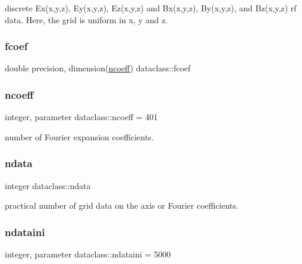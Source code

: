 discrete Ex(x,y,z), Ey(x,y,z), Ez(x,y,z) and Bx(x,y,z), By(x,y,z), and Bz(x,y,z) rf data. Here, the grid is uniform in x, y and z. 

\mbox{\label{namespacedataclass_ac8605e11e3fc14fbebbc843cc36c2836}} 
\subsubsection{\texorpdfstring{fcoef}{fcoef}}
{\footnotesize\ttfamily double precision, dimension(\mbox{\hyperlink{namespacedataclass_aea44837b0eb59e9b5a864f3a59c7facc}{ncoeff}}) dataclass\+::fcoef}

\mbox{\label{namespacedataclass_aea44837b0eb59e9b5a864f3a59c7facc}} 
\subsubsection{\texorpdfstring{ncoeff}{ncoeff}}
{\footnotesize\ttfamily integer, parameter dataclass\+::ncoeff = 401}



number of Fourier expansion coefficients. 

\mbox{\label{namespacedataclass_a72f075bdeedd35dc0962289e6f3461ba}} 
\subsubsection{\texorpdfstring{ndata}{ndata}}
{\footnotesize\ttfamily integer dataclass\+::ndata}



practical number of grid data on the axis or Fourier coefficients. 

\mbox{\label{namespacedataclass_a2578bbe9c4dc0892ee08a8619cd7e978}} 
\subsubsection{\texorpdfstring{ndataini}{ndataini}}
{\footnotesize\ttfamily integer, parameter dataclass\+::ndataini = 5000}



